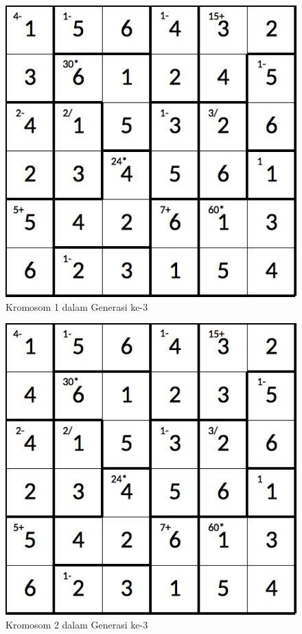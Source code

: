 \clearpage

\begin{figure}
\centering
\captionsetup{justification=centering}
\includegraphics[scale=0.333]{Gambar/hybridgenetic/Generation3Chromosome1}
\caption[Kromosom 1 dalam Generasi ke-3]{Kromosom 1 dalam Generasi ke-3}
\label{fig:analisisg3k1}
\end{figure}

\begin{figure}
\centering
\captionsetup{justification=centering}
\includegraphics[scale=0.333]{Gambar/hybridgenetic/Generation3Chromosome2}
\caption[Kromosom 2 dalam Generasi ke-3]{Kromosom 2 dalam Generasi ke-3}
\label{fig:analisisg3k2}
\end{figure}

